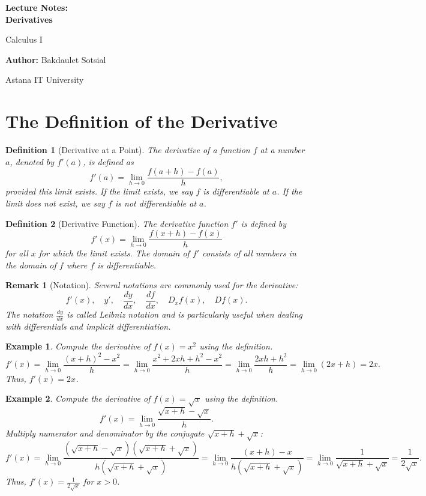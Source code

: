\documentclass[11pt,a4paper]{article}
\newtheorem{example}{Example}
\newtheorem{definition}{Definition}
\newtheorem{remark}{Remark}
\begin{document}
\begin{titlepage}
\centering
\vspace*{4cm}
{\Huge\bfseries Lecture Notes:\\ Derivatives\par}
\vspace{1cm}
{\Large Calculus I\par}
\vspace{2cm}
{\large \textbf{Author:} Bakdaulet Sotsial\par}
\vspace{1cm}
\vfill
{\small Astana IT University \par}
\vspace*{2cm}
\end{titlepage}
\tableofcontents
\newpage
\section{The Definition of the Derivative}
\begin{definition}[Derivative at a Point]
The \textit{derivative of a function $f$ at a number $a$}, denoted by $f'(a)$, is defined as
\[
f'(a) = \lim_{h \to 0} \frac{f(a+h) - f(a)}{h},
\]
provided this limit exists. If the limit exists, we say $f$ is \textit{differentiable at $a$}. If the limit does not exist, we say $f$ is \textit{not differentiable at $a$}.
\end{definition}
\begin{definition}[Derivative Function]
The \textit{derivative function} $f'$ is defined by
\[
f'(x) = \lim_{h \to 0} \frac{f(x+h) - f(x)}{h}
\]
for all $x$ for which the limit exists. The domain of $f'$ consists of all numbers in the domain of $f$ where $f$ is differentiable.
\end{definition}
\begin{remark}[Notation]
Several notations are commonly used for the derivative:
\[
f'(x), \quad y', \quad \frac{dy}{dx}, \quad \frac{df}{dx}, \quad D_x f(x), \quad D f(x).
\]
The notation $\frac{dy}{dx}$ is called Leibniz notation and is particularly useful when dealing with differentials and implicit differentiation.
\end{remark}
\begin{example}
Compute the derivative of $f(x) = x^2$ using the definition.
\[
f'(x) = \lim_{h \to 0} \frac{(x+h)^2 - x^2}{h} = \lim_{h \to 0} \frac{x^2 + 2xh + h^2 - x^2}{h} = \lim_{h \to 0} \frac{2xh + h^2}{h} = \lim_{h \to 0} (2x + h) = 2x.
\]
Thus, $f'(x) = 2x$.
\end{example}
\begin{example}
Compute the derivative of $f(x) = \sqrt{x}$ using the definition.
\[
f'(x) = \lim_{h \to 0} \frac{\sqrt{x+h} - \sqrt{x}}{h}.
\]
Multiply numerator and denominator by the conjugate $\sqrt{x+h} + \sqrt{x}$:
\[
f'(x) = \lim_{h \to 0} \frac{(\sqrt{x+h} - \sqrt{x})(\sqrt{x+h} + \sqrt{x})}{h(\sqrt{x+h} + \sqrt{x})} = \lim_{h \to 0} \frac{(x+h) - x}{h(\sqrt{x+h} + \sqrt{x})} = \lim_{h \to 0} \frac{1}{\sqrt{x+h} + \sqrt{x}} = \frac{1}{2\sqrt{x}}.
\]
Thus, $f'(x) = \frac{1}{2\sqrt{x}}$ for $x > 0$.
\end{example}
\end{document}

